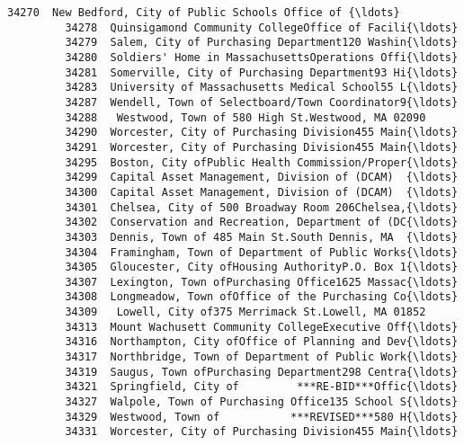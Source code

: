 \documentclass[11pt]{article}
\begin{document}
\begin{Verbatim}[commandchars=\\\{\}]
         34270  New Bedford, City of Public Schools Office of {\ldots}   
         34278  Quinsigamond Community CollegeOffice of Facili{\ldots}   
         34279  Salem, City of Purchasing Department120 Washin{\ldots}   
         34280  Soldiers' Home in MassachusettsOperations Offi{\ldots}   
         34281  Somerville, City of Purchasing Department93 Hi{\ldots}   
         34283  University of Massachusetts Medical School55 L{\ldots}   
         34287  Wendell, Town of Selectboard/Town Coordinator9{\ldots}   
         34288   Westwood, Town of 580 High St.Westwood, MA 02090   
         34290  Worcester, City of Purchasing Division455 Main{\ldots}   
         34291  Worcester, City of Purchasing Division455 Main{\ldots}   
         34295  Boston, City ofPublic Health Commission/Proper{\ldots}   
         34299  Capital Asset Management, Division of (DCAM)  {\ldots}   
         34300  Capital Asset Management, Division of (DCAM)  {\ldots}   
         34301  Chelsea, City of 500 Broadway Room 206Chelsea,{\ldots}   
         34302  Conservation and Recreation, Department of (DC{\ldots}   
         34303  Dennis, Town of 485 Main St.South Dennis, MA  {\ldots}   
         34304  Framingham, Town of Department of Public Works{\ldots}   
         34305  Gloucester, City ofHousing AuthorityP.O. Box 1{\ldots}   
         34307  Lexington, Town ofPurchasing Office1625 Massac{\ldots}   
         34308  Longmeadow, Town ofOffice of the Purchasing Co{\ldots}   
         34309   Lowell, City of375 Merrimack St.Lowell, MA 01852   
         34313  Mount Wachusett Community CollegeExecutive Off{\ldots}   
         34316  Northampton, City ofOffice of Planning and Dev{\ldots}   
         34317  Northbridge, Town of Department of Public Work{\ldots}   
         34319  Saugus, Town ofPurchasing Department298 Centra{\ldots}   
         34321  Springfield, City of         ***RE-BID***Offic{\ldots}   
         34327  Walpole, Town of Purchasing Office135 School S{\ldots}   
         34329  Westwood, Town of           ***REVISED***580 H{\ldots}   
         34331  Worcester, City of Purchasing Division455 Main{\ldots}   
         

\end{Verbatim}
\end{document}
